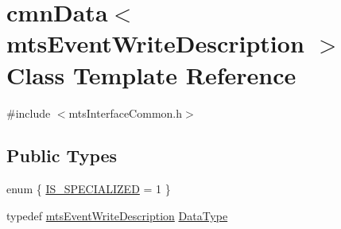 \hypertarget{classcmn_data_3_01mts_event_write_description_01_4}{\section{cmn\-Data$<$ mts\-Event\-Write\-Description $>$ Class Template Reference}
\label{classcmn_data_3_01mts_event_write_description_01_4}
}


{\ttfamily \#include $<$mts\-Interface\-Common.\-h$>$}

\subsection*{Public Types}
\begin{DoxyCompactItemize}
\item 
enum \{ \hyperlink{classcmn_data_3_01mts_event_write_description_01_4_a0b218a98ec9e414df903e270b08953a4ad99cc06b86ea1a9f70fb975444b212b7}{I\-S\-\_\-\-S\-P\-E\-C\-I\-A\-L\-I\-Z\-E\-D} = 1
 \}
\item 
typedef \hyperlink{classmts_event_write_description}{mts\-Event\-Write\-Description} \hyperlink{classcmn_data_3_01mts_event_write_description_01_4_a0c398e4adf26c99124f9f6cd19fb70dc}{Data\-Type}
\end{DoxyCompactItemize}
